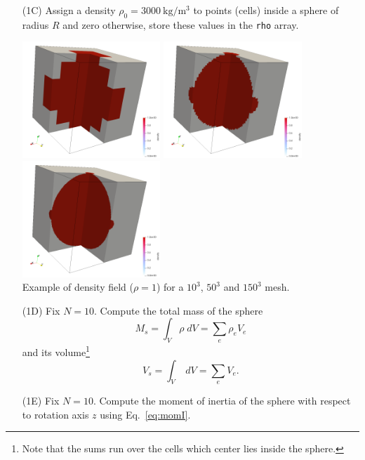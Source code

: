\begin{itemize}
\item[(1C)] Assign a density $\rho_0=3000~\si{\kilo\gram\per\cubic\metre}$ to points (cells) 
inside a sphere of radius $R$ and zero otherwise, store these values in the {\tt rho} array.

\begin{center}
\includegraphics[width=5.2cm]{images/geodynamics/rho10}
\includegraphics[width=5.2cm]{images/geodynamics/rho50}
\includegraphics[width=5.2cm]{images/geodynamics/rho150}\\
{\captionfont Example of density field ($\rho=1$) for a $10^3$, $50^3$ and $150^3$ mesh.}
\end{center}


\item[(1D)] Fix $N=10$. Compute the total mass of the sphere
\[
M_s = \int_V \rho \; dV = \sum_{e} \rho_e V_e
\] 
and its volume\footnote{Note that the sums run over the cells which center lies inside the sphere.}
\[
V_s = \int_V \; dV = \sum_{e}  V_e.
\] 

\item[(1E)] Fix $N=10$. Compute the moment of inertia of the sphere 
with respect to rotation axis $z$ using Eq.~\eqref{eq:momI}. 


\end{itemize}
